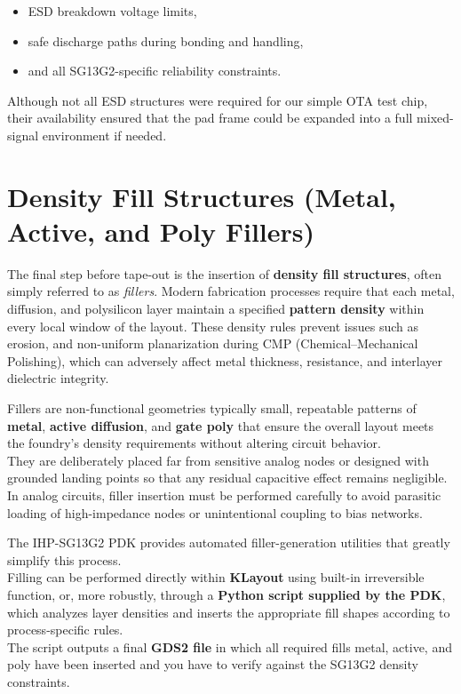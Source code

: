 \documentclass[
  11pt,
  a4paper,
  oneside]{scrbook}
\providecommand{\tightlist}{%
  \setlength{\itemsep}{0pt}\setlength{\parskip}{0pt}}
\begin{document}
\begin{itemize}
\tightlist
\item
  ESD breakdown voltage limits,\\
\item
  safe discharge paths during bonding and handling,\\
\item
  and all SG13G2-specific reliability constraints.
\end{itemize}

Although not all ESD structures were required for our simple OTA test
chip, their availability ensured that the pad frame could be expanded
into a full mixed-signal environment if needed.

\section{Density Fill Structures (Metal, Active, and Poly
Fillers)}\label{density-fill-structures-metal-active-and-poly-fillers}

The final step before tape-out is the insertion of \textbf{density fill
structures}, often simply referred to as \emph{fillers}. Modern
fabrication processes require that each metal, diffusion, and
polysilicon layer maintain a specified \textbf{pattern density} within
every local window of the layout. These density rules prevent issues
such as erosion, and non-uniform planarization during CMP
(Chemical--Mechanical Polishing), which can adversely affect metal
thickness, resistance, and interlayer dielectric integrity.

Fillers are non-functional geometries typically small, repeatable
patterns of \textbf{metal}, \textbf{active diffusion}, and \textbf{gate
poly} that ensure the overall layout meets the foundry's density
requirements without altering circuit behavior.\\
They are deliberately placed far from sensitive analog nodes or designed
with grounded landing points so that any residual capacitive effect
remains negligible. In analog circuits, filler insertion must be
performed carefully to avoid parasitic loading of high-impedance nodes
or unintentional coupling to bias networks.

The IHP-SG13G2 PDK provides automated filler-generation utilities that
greatly simplify this process.\\
Filling can be performed directly within \textbf{KLayout} using built-in
irreversible function, or, more robustly, through a \textbf{Python
script supplied by the PDK}, which analyzes layer densities and inserts
the appropriate fill shapes according to process-specific rules.\\
The script outputs a final \textbf{GDS2 file} in which all required
fills metal, active, and poly have been inserted and you have to verify
against the SG13G2 density constraints.
\end{document}
